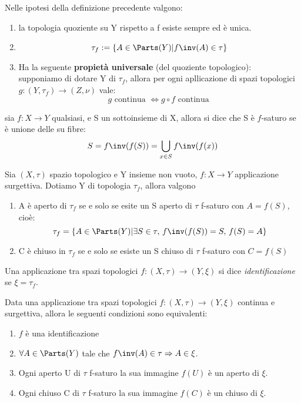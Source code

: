 \documentclass[a4paper]{article}
\begin{document}
\begin{lem}
	Nelle ipotesi della definizione precedente valgono:
	\begin{enumerate}
		\item la topologia quoziente su Y rispetto a f esiste sempre ed è unica.
		\item 
		\[
			\tau_f := \left\{ A \in \Parts (Y) | f\inv (A) \in \tau \right\}
		\]
		\item Ha la seguente \textbf{propietà universale} (del quoziente topologico):\\
		supponiamo di dotare Y di $\tau _f $, allora per ogni apllicazione di spazi topologici $g:(Y,\tau_f ) \to (Z,\nu ) $ vale: 
		\[
		g \text{ continua } \Longleftrightarrow g\circ f \text{ continua }
		\]
		
	\end{enumerate}
\end{lem}

\begin{deff}
	sia $ f: X \to Y $ qualsiasi, e S un sottoinsieme di X, allora si dice che S è $f$-saturo se è unione delle su fibre:
	\[
		S = f\inv (f(S)) = \bigcup_{x\in S} f\inv (f(x))
	\]
\end{deff}

\begin{lem}
	Sia $(X,\tau )$ spazio topologico e Y insieme non vuoto, $f : X \to Y $ applicazione surgettiva. Dotiamo Y di topologia $\tau_f$, allora valgono\begin{enumerate}
		\item A è aperto di $\tau_f$ se e solo se esite un S aperto di $\tau$ f-saturo con $A=f(S)$, cioè:
		\[
			\tau_f = \{ A \in \Parts(Y) | \exists S \in \tau , \, f\inv (f(S)) = S, \, f(S) = A \}
		\]
		\item C è chiuso in $\tau_f$ se e solo se esiste un S chiuso di $\tau$ f-saturo con $C=f(S)$
	\end{enumerate}
\end{lem}

\begin{deff}
	Una applicazione tra spazi topologici $f: (X,\tau ) \to (Y,\xi ) $ si dice \textit{identificazione} se $\xi= \tau _f$. 
\end{deff}

\begin{prop}
	Data una applicazione tra spazi topologici $f: (X,\tau ) \to (Y,\xi ) $ continua e surgettiva, allora le seguenti condizioni sono equivalenti:
	\begin{enumerate}
		\item $ f $ è una identificazione
		\item $\forall A \in \Parts (Y) $ tale che $f\inv (A)\in \tau \Rightarrow A \in \xi $.
		\item Ogni aperto U di $\tau$ f-saturo la sua immagine $f(U) $ è un aperto di $\xi$.
		\item Ogni chiuso C di $\tau$ f-saturo la sua immagine $f(C) $ è un chiuso di $\xi$.
		
	\end{enumerate}
\end{prop}
\end{document}
